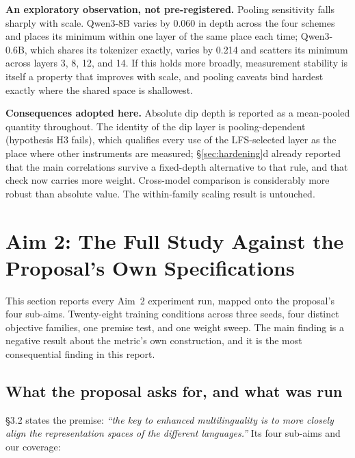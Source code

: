 \documentclass[11pt,a4paper]{article}
\begin{document}
\textbf{An exploratory observation, not pre-registered.} Pooling sensitivity
falls sharply with scale. Qwen3-8B varies by 0.060 in depth across the four
schemes and places its minimum within one layer of the same place each time;
Qwen3-0.6B, which shares its tokenizer exactly, varies by 0.214 and scatters
its minimum across layers 3, 8, 12, and 14. If this holds more broadly,
measurement stability is itself a property that improves with scale, and
pooling caveats bind hardest exactly where the shared space is shallowest.

\textbf{Consequences adopted here.} Absolute dip depth is reported as a
mean-pooled quantity throughout. The identity of the dip layer is
pooling-dependent (hypothesis H3 fails), which qualifies every use of the
LFS-selected layer as the place where other instruments are measured;
\S\ref{sec:hardening}d already reported that the main correlations
survive a fixed-depth alternative to that rule, and that check now carries
more weight. Cross-model comparison is considerably more robust than
absolute value. The within-family scaling result is untouched.

\section{Aim 2: The Full Study Against the Proposal's Own Specifications}
\label{sec:aim2}
This section reports every Aim~2 experiment run, mapped onto the proposal's
four sub-aims. Twenty-eight training conditions across three seeds, four distinct
objective families, one premise test, and one weight sweep. The main finding is
a negative result about the metric's own construction, and it is the most
consequential finding in this report.

\subsection{What the proposal asks for, and what was run}
\S3.2 states the premise: \emph{``the key to enhanced multilinguality is to
more closely align the representation spaces of the different languages.''}
Its four sub-aims and our coverage:
\end{document}
